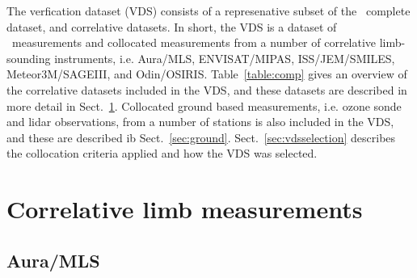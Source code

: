 The verfication dataset (VDS) consists of a represenative subset of 
the \smr\ complete dataset, and correlative datasets.
In short, the VDS is a dataset of \smr\ measurements 
and collocated measurements from a number of correlative
limb-sounding instruments, i.e. Aura/MLS, ENVISAT/MIPAS,
ISS/JEM/SMILES, Meteor3M/SAGEIII, and Odin/OSIRIS.
Table~\ref{table:comp} gives an overview of the correlative
datasets included in the VDS, and these datasets
are described in more detail in Sect.~\ref{sec:corrmeas}.
Collocated ground based measurements, i.e.
ozone sonde and lidar observations, from 
a number of stations is also included
in the VDS, and these are described ib Sect.~\ref{sec:ground}.
Sect.~\ref{sec:vdsselection} describes the collocation criteria
applied and how the VDS was selected. 

\section{Correlative limb measurements}
\label{sec:corrmeas}
\subsection{Aura/MLS}

